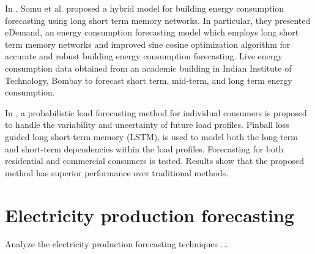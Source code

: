 In \cite{SOMU2020114131}, Somu et al. proposed a hybrid model for building energy consumption forecasting using long short term memory networks.
In particular, they presented eDemand, an energy consumption forecasting model which employs long short term memory networks and improved sine cosine optimization algorithm for accurate and robust building energy consumption forecasting.
Live energy consumption data obtained from an academic building in Indian Institute of Technology, Bombay to forecast short term, mid-term, and long term energy consumption.

In \cite{WANG201910}, a probabilistic load forecasting method for individual consumers is proposed to handle the variability and uncertainty of future load profiles.
Pinball loss guided long short-term memory (LSTM), is used to model both the long-term and short-term dependencies within the load profiles.
Forecasting for both residential and commercial consumers is tested.
Results show that the proposed method has superior performance over traditional methods.


\section{Electricity production forecasting}
\label{sec:productionsoa}
\vspace{0.2 cm}

Analyze the electricity production forecasting techniques ...
